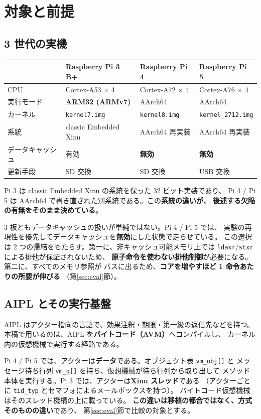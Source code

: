 \documentclass[a4paper,11pt]{ltjsarticle}
\begin{document}
\section{対象と前提}\label{sec:target}

\subsection{3 世代の実機}
\begin{center}
\begin{tabular}{llll}
\toprule
 & Raspberry Pi 3 B+ & Raspberry Pi 4 & Raspberry Pi 5 \\
\midrule
CPU & Cortex-A53 $\times$ 4 & Cortex-A72 $\times$ 4 & Cortex-A76 $\times$ 4 \\
実行モード & \textbf{ARM32 (ARMv7)} & AArch64 & AArch64 \\
カーネル & \texttt{kernel7.img} & \texttt{kernel8.img} & \texttt{kernel\_2712.img} \\
系統 & classic Embedded Xinu & AArch64 再実装 & AArch64 再実装 \\
データキャッシュ & 有効 & \textbf{無効} & \textbf{無効} \\
更新手段 & SD 交換 & SD 交換 & USB 交換 \\
\bottomrule
\end{tabular}
\end{center}

Pi 3 は classic Embedded Xinu の系統を保った 32 ビット実装であり、
Pi 4 / Pi 5 は AArch64 で書き直された別系統である。この\textbf{系統の違いが、
後述する欠陥の有無をそのまま決めている}。

3 板ともデータキャッシュの扱いが単純ではない。Pi 4 / Pi 5 では、
実験の再現性を優先してデータキャッシュを\textbf{無効}にした状態で走らせている。
この選択は 2 つの帰結をもたらす。第一に、非キャッシュ可能メモリ上では
\texttt{ldaxr}/\texttt{stxr} による排他が保証されないため、
\textbf{原子命令を使わない排他制御}が必要になる。第二に、すべてのメモリ参照が
バスに出るため、\textbf{コアを増やすほど 1 命令あたりの所要が伸びる}
（第\ref{sec:eval}節）。

\subsection{AIPL とその実行基盤}
AIPL はアクター指向の言語で、効果注釈・期限・第一級の返信先などを持つ。
本稿で用いるのは、AIPL を\textbf{バイトコード（AVM）}へコンパイルし、
カーネル内の仮想機械で実行する経路である。

Pi 4 / Pi 5 では、アクターは\textbf{データ}である。オブジェクト表 \texttt{vm\_obj[]} と
メッセージ待ち行列 \texttt{vm\_q[]} を持ち、仮想機械が待ち行列から取り出して
メソッド本体を実行する。Pi 3 では、アクターは\textbf{Xinu スレッド}である
（アクターごとに \texttt{tid\_typ} とセマフォによるメールボックスを持つ）。
バイトコード仮想機械はそのスレッド機構の上に載っている。
\textbf{この違いは移植の都合ではなく、方式そのものの違い}であり、
第\ref{sec:eval}節で比較の対象とする。
\end{document}
